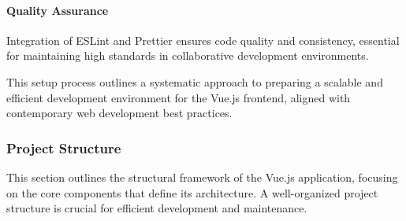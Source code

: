 \paragraph{Quality Assurance}
Integration of ESLint and Prettier ensures code quality and consistency, essential for maintaining high standards in collaborative development environments.

This setup process outlines a systematic approach to preparing a scalable and efficient development environment for the Vue.js frontend, aligned with contemporary web development best practices.

\subsubsection{Project Structure}

This section outlines the structural framework of the Vue.js application, focusing on the core components that define its architecture. A well-organized project structure is crucial for efficient development and maintenance.

